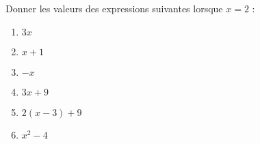 
\begin{exercice}\label{exosmath-0804}

    Donner les valeurs des expressions suivantes lorsque \( x=2\) :
    \begin{multicols}{2}
        \begin{enumerate}
            \item
                \( 3x\)
            \item
                \( x+1\)
            \item
                \( -x\)
            \item
                \( 3x+9\)
            \item
                \( 2(x-3)+9\)
            \item
                \( x^2-4\)
        \end{enumerate}
    \end{multicols}

\end{exercice}
